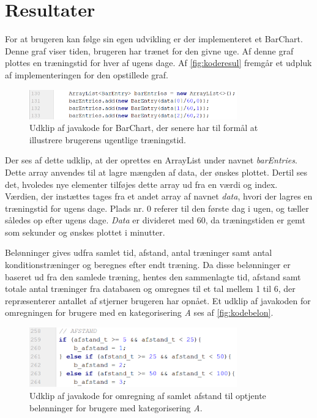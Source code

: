 \section{Resultater}
For at brugeren kan følge sin egen udvikling er der implementeret et BarChart. Denne graf viser tiden, brugeren har trænet for den givne uge. Af denne graf plottes en træningstid for hver af ugens dage. Af \autoref{fig:koderesul} fremgår et udpluk af implementeringen for den opstillede graf.

\begin{figure} [H]
\centering
\includegraphics[width=0.8\textwidth]{figures/imple/koderesul}
\caption{Udklip af javakode for BarChart, der senere har til formål at illustrere brugerens ugentlige træningstid.}
\label{fig:koderesul}
\end{figure} 

\noindent
Der ses af dette udklip, at der oprettes en ArrayList under navnet \textit{barEntries}. Dette array anvendes til at lagre mængden af data, der ønskes plottet. Dertil ses det, hvoledes nye elementer tilføjes dette array ud fra en værdi og index. Værdien, der instættes tages fra et andet array af navnet \textit{data}, hvori der lagres en træningstid for ugens dage. Plads nr. 0 referer til den første dag i ugen, og tæller således op efter ugens dage. \textit{Data} er divideret med 60, da træningstiden er gemt som sekunder og ønskes plottet i minutter. 

Belønninger gives udfra samlet tid, afstand, antal træninger samt antal konditionstræninger og beregnes efter endt træning. Da disse belønninger er baseret ud fra den samlede træning, hentes den sammenlagte tid, afstand samt totale antal træninger fra databasen og omregnes til et tal mellem 1 til 6, der repræsenterer antallet af stjerner brugeren har opnået. Et udklip af javakoden for omregningen for brugere med en kategorisering \textit{A} ses af \autoref{fig:kodebelon}.

\begin{figure} [H]
\centering
\includegraphics[width=0.8\textwidth]{figures/imple/kodebelon}
\caption{Udklip af javakode for omregning af samlet afstand til optjente belønninger for brugere med kategorisering \textit{A}.}
\label{fig:kodebelon}
\end{figure} 

